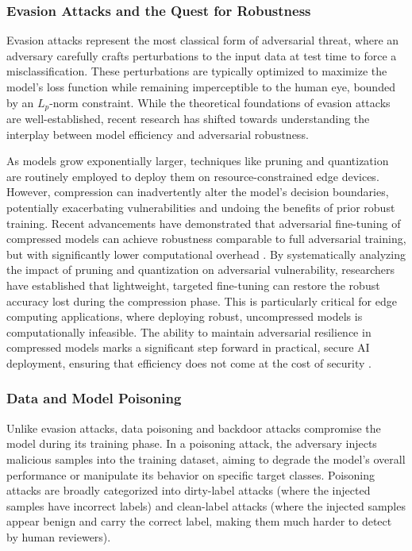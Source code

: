 \documentclass[11pt,a4paper]{article}
\begin{document}
\subsubsection{Evasion Attacks and the Quest for Robustness}

Evasion attacks represent the most classical form of adversarial threat, where an adversary carefully crafts perturbations to the input data at test time to force a misclassification. These perturbations are typically optimized to maximize the model's loss function while remaining imperceptible to the human eye, bounded by an $L_p$-norm constraint. While the theoretical foundations of evasion attacks are well-established, recent research has shifted towards understanding the interplay between model efficiency and adversarial robustness. 

As models grow exponentially larger, techniques like pruning and quantization are routinely employed to deploy them on resource-constrained edge devices. However, compression can inadvertently alter the model's decision boundaries, potentially exacerbating vulnerabilities and undoing the benefits of prior robust training. Recent advancements have demonstrated that adversarial fine-tuning of compressed models can achieve robustness comparable to full adversarial training, but with significantly lower computational overhead \cite{Thorsteinsson_2024_Adversarial}. By systematically analyzing the impact of pruning and quantization on adversarial vulnerability, researchers have established that lightweight, targeted fine-tuning can restore the robust accuracy lost during the compression phase. This is particularly critical for edge computing applications, where deploying robust, uncompressed models is computationally infeasible. The ability to maintain adversarial resilience in compressed models marks a significant step forward in practical, secure AI deployment, ensuring that efficiency does not come at the cost of security \cite{Thorsteinsson_2024_Adversarial}.

\subsubsection{Data and Model Poisoning}

Unlike evasion attacks, data poisoning and backdoor attacks compromise the model during its training phase. In a poisoning attack, the adversary injects malicious samples into the training dataset, aiming to degrade the model's overall performance or manipulate its behavior on specific target classes. Poisoning attacks are broadly categorized into dirty-label attacks (where the injected samples have incorrect labels) and clean-label attacks (where the injected samples appear benign and carry the correct label, making them much harder to detect by human reviewers). 
\end{document}
